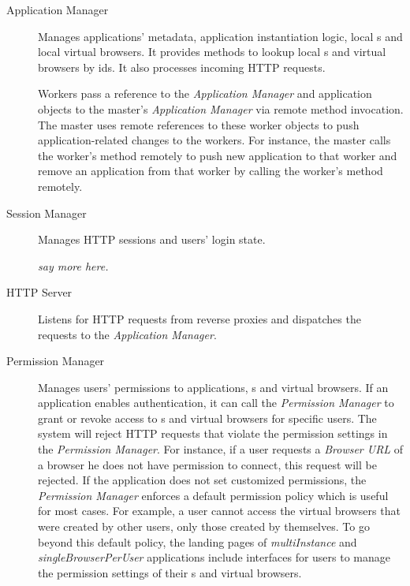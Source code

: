 \begin{description}

\item[Application Manager] Manages applications' metadata, application instantiation
logic, local \appins{}s
and local virtual browsers. It provides methods to lookup local \appins{}s and virtual
browsers by ids. It also processes incoming HTTP requests.

Workers pass a reference to the \emph{Application Manager} and application objects to
the master's \emph{Application Manager} via remote method invocation.  The
master uses remote references to these worker
objects to push application-related changes to the  workers.  For instance,
the master calls  the worker's  method remotely to
push new application to that worker and remove an application from that worker
by calling the worker's  method remotely.

\item[Session Manager] Manages HTTP sessions and users' login state. 

    \emph{say more here.}

\item[HTTP Server] Listens for HTTP requests from reverse proxies and dispatches 
    the requests to the \emph{Application Manager}. 

\item[Permission Manager] 
Manages users' permissions to applications, \appins{}s and virtual browsers.
If an application enables authentication, it can call the \emph{Permission
Manager} to grant or revoke access to  \appins{}s and virtual
browsers for specific users. The system will reject HTTP requests that violate
the permission settings in the  \emph{Permission Manager}. For instance, if a
user requests a \emph{Browser URL} of a browser he does not have permission to
connect, this request will be rejected. If the application does not set
customized permissions, the \emph{Permission Manager} enforces a default
permission policy which is useful for most cases.  For example, a user
cannot access the virtual browsers that were created by other users, only
those created by themselves.
To go beyond this default policy,
the landing pages of \emph{multiInstance} and \emph{singleBrowserPerUser}
applications include interfaces for users to manage the permission settings of
their \appins{}s and virtual browsers.

\end{description}



